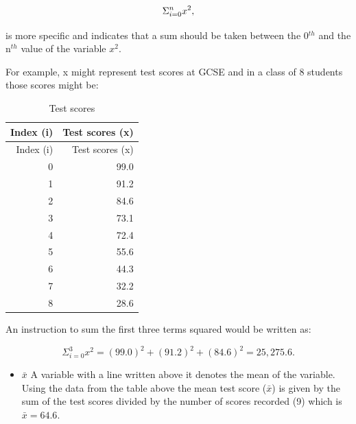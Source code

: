 \documentclass[
]{book}
\providecommand{\tightlist}{%
  \setlength{\itemsep}{0pt}\setlength{\parskip}{0pt}}
\begin{document}
\[\large\Sigma_{i=0}^{n} x^2,\]

is more specific and indicates that a sum should be taken between the 0\(^{th}\) and the n\(^{th}\) value of the variable \(x^2\).

For example, x might represent test scores at GCSE and in a class of 8 students those scores might be:

\begin{longtable}[]{@{}rr@{}}
\caption{\label{tab:table0112} Test scores}\tabularnewline
\toprule
Index (i) & Test scores (x) \\
\midrule
\endfirsthead
\toprule
Index (i) & Test scores (x) \\
\midrule
\endhead
0 & 99.0 \\
1 & 91.2 \\
2 & 84.6 \\
3 & 73.1 \\
4 & 72.4 \\
5 & 55.6 \\
6 & 44.3 \\
7 & 32.2 \\
8 & 28.6 \\
\bottomrule
\end{longtable}

An instruction to sum the first three terms squared would be written as:

\[\Sigma_{i=0}^{3} x^2 = (99.0)^2+(91.2)^2+(84.6)^2 = 25,275.6.\]

\begin{itemize}
\tightlist
\item
  \(\bar{x}\) A variable with a line written above it denotes the mean of the variable. Using the data from the table above the mean test score (\(\bar{x}\)) is given by the sum of the test scores divided by the number of scores recorded (9) which is \(\bar{x}=64.6.\)
\end{itemize}

  
\end{document}
